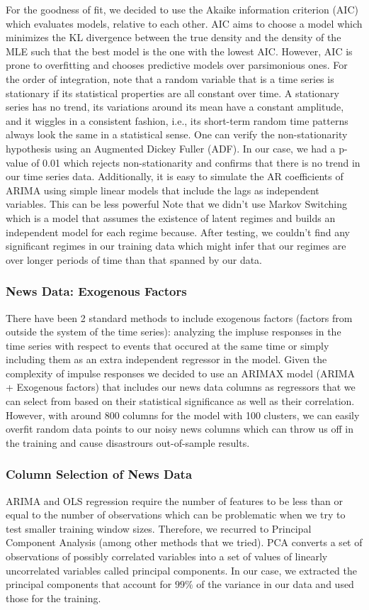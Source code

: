 For the goodness of fit, we decided to use the Akaike information criterion (AIC) which evaluates models, relative to each other. AIC aims to choose a model which minimizes the KL divergence between the true density and the density of the MLE such that the best model is the one with the lowest AIC. However, AIC is prone to overfitting and chooses predictive models over parsimonious ones.
For the order of integration, note that a random variable that is a time series is stationary if its statistical properties are all constant over time.  A stationary series has no trend, its variations around its mean have a constant amplitude, and it wiggles in a consistent fashion, i.e., its short-term random time patterns always look the same in a statistical sense. \cite{tsay, VAR}
One can verify the non-stationarity hypothesis using an Augmented Dickey Fuller (ADF). In our case, we had a p-value of 0.01 which rejects non-stationarity and confirms that there is no trend in our time series data.
Additionally, it is easy to simulate the AR coefficients of ARIMA using simple linear models that include the lags as independent variables. This can be less powerful
Note that we didn't use Markov Switching which is a model that assumes the existence of latent regimes and builds an independent model for each regime because.\cite{MS} After testing, we couldn't find any significant regimes in our training data which might infer that our regimes are over longer periods of time than that spanned by our data.
\subsubsection{News Data: Exogenous Factors}
There have been 2 standard methods to include exogenous factors (factors from outside the system of the time series): analyzing the impluse responses in the time series with respect to events that occured at the same time or simply including them as an extra independent regressor in the model. Given the complexity of impulse responses we decided to use an ARIMAX model (ARIMA + Exogenous factors) that includes our news data columns as regressors that we can select from based on their statistical significance as well as their correlation.
However, with around 800 columns for the model with 100 clusters, we can easily overfit random data points to our noisy news columns which can throw us off in the training and cause disastrours out-of-sample results.
\subsubsection{Column Selection of News Data}
ARIMA and OLS regression require the number of features to be less than or equal to the number of observations which can be problematic when we try to test smaller training window sizes. Therefore, we recurred to Principal Component Analysis (among other methods that we tried). PCA converts a set of observations of possibly correlated variables into a set of values of linearly uncorrelated variables called principal components.\cite{PCA} In our case, we extracted the principal components that account for $99\%$ of the variance in our data and used those for the training.
